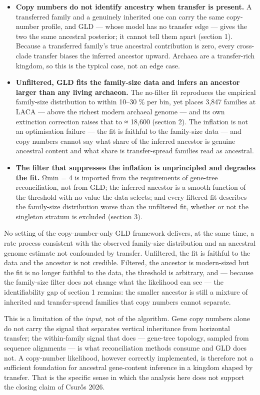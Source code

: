 \documentclass[
  10pt,
]{article}
\providecommand{\tightlist}{%
  \setlength{\itemsep}{0pt}\setlength{\parskip}{0pt}}
\begin{document}
\begin{itemize}
\tightlist
\item
  \textbf{Copy numbers do not identify ancestry when transfer is
  present.} A transferred family and a genuinely inherited one can carry
  the same copy-number profile, and GLD --- whose model has no transfer
  edge --- gives the two the same ancestral posterior; it cannot tell
  them apart (section 1). Because a transferred family's true ancestral
  contribution is zero, every cross-clade transfer biases the inferred
  ancestor upward. Archaea are a transfer-rich kingdom, so this is the
  typical case, not an edge case.
\item
  \textbf{Unfiltered, GLD fits the family-size data and infers an
  ancestor larger than any living archaeon.} The no-filter fit
  reproduces the empirical family-size distribution to within 10--30 \%
  per bin, yet places 3,847 families at LACA --- above the richest
  modern archaeal genome --- and its own extinction correction raises
  that to ≈ 18,600 (section 2). The inflation is not an optimisation
  failure --- the fit is faithful to the family-size data --- and copy
  numbers cannot say what share of the inferred ancestor is genuine
  ancestral content and what share is transfer-spread families read as
  ancestral.
\item
  \textbf{The filter that suppresses the inflation is unprincipled and
  degrades the fit.} Ωmin = 4 is imported from the requirements of
  gene-tree reconciliation, not from GLD; the inferred ancestor is a
  smooth function of the threshold with no value the data selects; and
  every filtered fit describes the family-size distribution worse than
  the unfiltered fit, whether or not the singleton stratum is excluded
  (section 3).
\end{itemize}

No setting of the copy-number-only GLD framework delivers, at the same
time, a rate process consistent with the observed family-size
distribution and an ancestral genome estimate not confounded by
transfer. Unfiltered, the fit is faithful to the data and the ancestor
is not credible. Filtered, the ancestor is modern-sized but the fit is
no longer faithful to the data, the threshold is arbitrary, and ---
because the family-size filter does not change what the likelihood can
see --- the identifiability gap of section 1 remains: the smaller
ancestor is still a mixture of inherited and transfer-spread families
that copy numbers cannot separate.

This is a limitation of the \emph{input}, not of the algorithm. Gene
copy numbers alone do not carry the signal that separates vertical
inheritance from horizontal transfer; the within-family signal that does
--- gene-tree topology, sampled from sequence alignments --- is what
reconciliation methods consume and GLD does not. A copy-number
likelihood, however correctly implemented, is therefore not a sufficient
foundation for ancestral gene-content inference in a kingdom shaped by
transfer. That is the specific sense in which the analysis here does not
support the closing claim of Csurős 2026.
\end{document}
